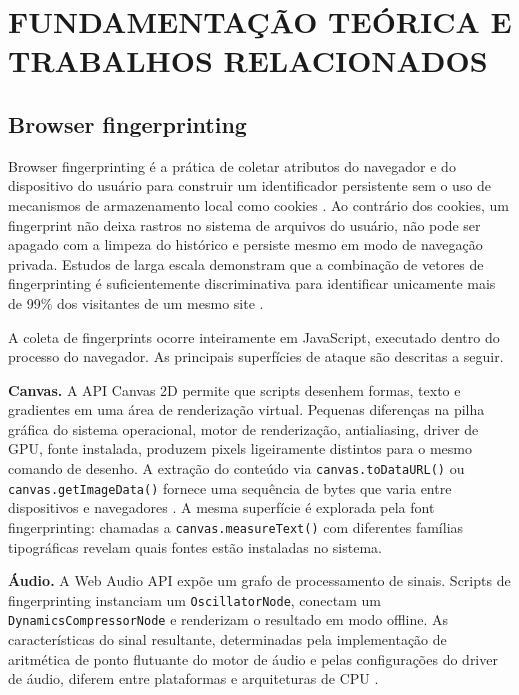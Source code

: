\chapter{FUNDAMENTAÇÃO TEÓRICA E TRABALHOS RELACIONADOS}
\label{cap:fundamentacao}

\section{Browser fingerprinting}
\label{sec:fingerprinting}

Browser fingerprinting é a prática de coletar atributos do navegador e do
dispositivo do usuário para construir um identificador persistente sem o uso de
mecanismos de armazenamento local como cookies \cite{eckersley2010}. Ao
contrário dos cookies, um fingerprint não deixa rastros no sistema
de arquivos do usuário, não pode ser apagado com a limpeza do histórico e persiste
mesmo em modo de navegação privada. Estudos de larga escala demonstram que a
combinação de vetores de fingerprinting é suficientemente discriminativa
para identificar unicamente mais de 99\% dos visitantes de um mesmo site
\cite{laperdrix2016}.

A coleta de fingerprints ocorre inteiramente em JavaScript, executado
dentro do processo do navegador. As principais superfícies de ataque são descritas
a seguir.

\textbf{Canvas.} A API Canvas 2D permite que scripts desenhem formas, texto e
gradientes em uma área de renderização virtual. Pequenas diferenças na pilha
gráfica do sistema operacional, motor de renderização, antialiasing, driver de
GPU, fonte instalada, produzem pixels ligeiramente distintos para o mesmo
comando de desenho. A extração do conteúdo via \texttt{canvas.toDataURL()} ou
\texttt{canvas.getImageData()} fornece uma sequência de bytes que varia entre
dispositivos e navegadores \cite{mowery2012}. A mesma superfície é explorada pela
font fingerprinting: chamadas a \texttt{canvas.measureText()} com
diferentes famílias tipográficas revelam quais fontes estão instaladas no sistema.

\textbf{Áudio.} A Web Audio API expõe um grafo de processamento de sinais.
Scripts de fingerprinting instanciam um \texttt{OscillatorNode}, conectam
um \texttt{DynamicsCompressorNode} e renderizam o resultado em modo offline.
As características do sinal resultante, determinadas pela implementação de
aritmética de ponto flutuante do motor de áudio e pelas configurações do driver de
áudio, diferem entre plataformas e arquiteturas de CPU \cite{englehardt2016}.

